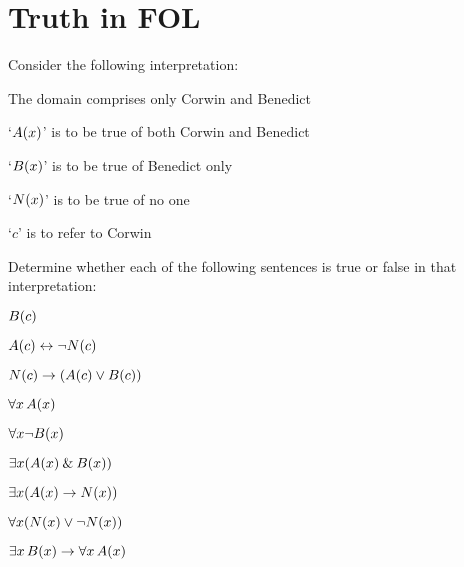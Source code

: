 

\chapter{Truth in FOL}\setcounter{ProbPart}{0}
\problempart
\label{pr.TorF1}
Consider the following interpretation:
	\begin{ebullet}
		\item The domain comprises only Corwin and Benedict
		\item `$\mathord{A}(x)$' is to be true of both Corwin and Benedict
		\item `$\mathord{B}(x)$' is to be true of Benedict only
		\item `$\mathord{N}(x)$' is to be true of no one
		\item `$c$' is to refer to Corwin
	\end{ebullet}
Determine whether each of the following sentences is true or false in that interpretation:
\begin{earg}
\item $\mathord{B}(c)$ \hfill {}
\item $\mathord{A}(c) \leftrightarrow \neg \mathord{N}(c)$ \hfill {}
\item $\mathord{N}(c) \rightarrow (\mathord{A}(c) \vee \mathord{B}(c))$ \hfill {}
\item $\forall x\,\mathord{A}(x)$ \hfill {}
\item $\forall x \neg \mathord{B}(x)$ \hfill {}
\item $\exists x(\mathord{A}(x) \mathbin{\&} \mathord{B}(x))$ \hfill {}
\item $\exists x(\mathord{A}(x) \rightarrow \mathord{N}(x))$ \hfill {}
\item $\forall x(\mathord{N}(x) \vee \neg \mathord{N}(x))$ \hfill {}
\item $\exists x\,\mathord{B}(x) \rightarrow \forall x\,\mathord{A}(x)$ \hfill {}
\end{earg}

